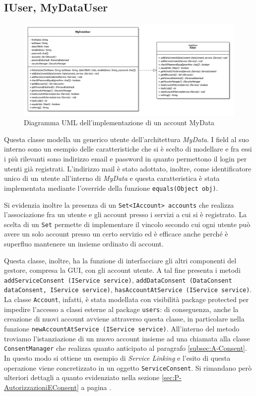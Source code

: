 \subsection{IUser, MyDataUser}
\begin{figure} [h]
	\includegraphics[width=\linewidth]{pictures/Accounting-MyDataUsr.png}
	\caption{Diagramma UML dell'implementazione di un account MyData}
	\label{fig:Accounting-MyDatUsr}
\end{figure}
Questa classe modella un generico utente dell’architettura \textit{MyData}. I field al suo interno sono un esempio delle caratteristiche che si \`e scelto di modellare e fra essi i pi\`u rilevanti sono indirizzo email e password in quanto permettono il login per utenti gi\`a registrati. L’indirizzo mail \`e stato adottato, inoltre, come identificatore unico di un utente all’interno di \textit{MyData} e questa caratteristica \`e stata implementata mediante l’override della funzione \texttt{equals(Object obj)}.

Si evidenzia inoltre la presenza di un \texttt{Set<IAccount> accounts} che realizza l’associazione fra un utente e gli account presso i servizi a cui si \`e registrato. La scelta di un \texttt{Set} permette di implementare il vincolo secondo cui ogni utente pu\`o avere un solo account presso un certo servizio ed \`e efficace anche perch\'e \`e superfluo mantenere un insieme ordinato di account.

Questa classe, inoltre, ha la funzione di interfacciare gli altri componenti del gestore, compresa la GUI, con gli account utente. A tal fine presenta i metodi \texttt{addServiceConsent (IService service)}, \texttt{addDataConsent (DataConsent dataConsent, IService service)}, \texttt{hasAccountAtService (IService service)}.  La classe \texttt{Account}, infatti, \`e stata modellata con visibilit\`a package protected per impedire l’accesso a classi esterne al package \texttt{users}: di conseguenza, anche la creazione di nuovi account avviene attraverso questa classe, in particolare nella funzione \texttt{newAccountAtService (IService service)}. All’interno del metodo troviamo l’istanziazione di un nuovo account insieme ad una chiamata alla classe \texttt{ConsentManager} che realizza quanto anticipato al paragrafo \ref{subsec:A-Consent}. In questo modo si ottiene un esempio di \textit{Service Linking} e l’esito di questa operazione viene concretizzato in un oggetto \texttt{ServiceConsent}. Si rimandano per\`o ulteriori dettagli a quanto evidenziato nella sezione \ref{sec:P-AutorizzazioniEConsent} a pagina \pageref{sec:P-AutorizzazioniEConsent}.

